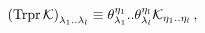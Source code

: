 \begin{equation} \left(\mbox{Trpr}
\,{\cal
K}\right)_{\lambda_{1}..\lambda_{l}}\equiv\theta^{\eta_{1}}_{\lambda_{1}}
..\theta^{\eta_{l}}_{\lambda_{l}}{\cal
K}_{\eta_{1}..\eta_{l}}\,,\nonumber
\end{equation}

